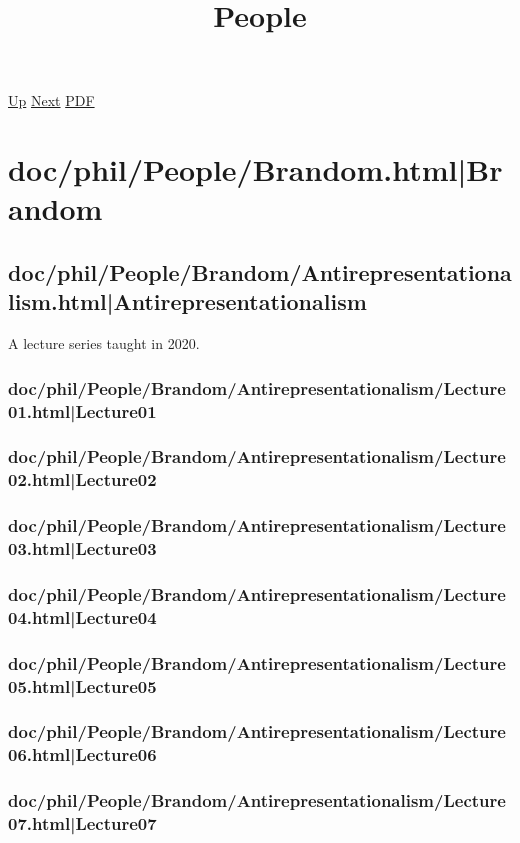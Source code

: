 \documentclass[12pt,a4paper]{report}
\begin{document}
 \href{doc/phil.html}{Up} 
 \href{doc/phil/PhilProblems.html}{Next} 
 \href{doc/phil/People.pdf}{PDF} 
\title{People}

\tableofcontents

\part{doc/phil/People/Brandom.html|Brandom}

\chapter{doc/phil/People/Brandom/Antirepresentationalism.html|Antirepresentationalism}
A lecture series taught in 2020.
\section{doc/phil/People/Brandom/Antirepresentationalism/Lecture01.html|Lecture01}

\section{doc/phil/People/Brandom/Antirepresentationalism/Lecture02.html|Lecture02}

\section{doc/phil/People/Brandom/Antirepresentationalism/Lecture03.html|Lecture03}

\section{doc/phil/People/Brandom/Antirepresentationalism/Lecture04.html|Lecture04}

\section{doc/phil/People/Brandom/Antirepresentationalism/Lecture05.html|Lecture05}

\section{doc/phil/People/Brandom/Antirepresentationalism/Lecture06.html|Lecture06}

\section{doc/phil/People/Brandom/Antirepresentationalism/Lecture07.html|Lecture07}
\end{document}
